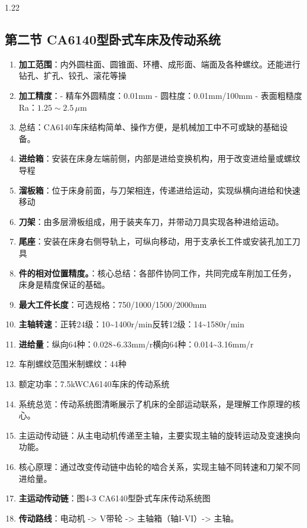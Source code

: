 \documentclass[12pt,a4paper]{article}
\begin{document}
\begin{spacing}{1.22}
\subsection{第二节 CA6140型卧式车床及传动系统}
\begin{tcolorbox}[colback=yellow!6,colframe=red!55!black,title=重点,left=1mm,right=1mm]
\begin{enumerate}[leftmargin=2.2em,label=\arabic*.]
  \item \textbf{加工范围}：内外圆柱面、圆锥面、环槽、成形面、端面及各种螺纹。还能进行钻孔、扩孔、铰孔、滚花等操
  \item \textbf{加工精度}：- 精车外圆精度：0.01mm - 圆柱度：0.01mm/100mm - 表面粗糙度 Ra：$1.25\sim2.5\,\mu\text{m}$
  \item 总结：CA6140车床结构简单、操作方便，是机械加工中不可或缺的基础设备。
  \item \textbf{进给箱}：安装在床身左端前侧，内部是进给变换机构，用于改变进给量或螺纹导程
  \item \textbf{溜板箱}：位于床身前面，与刀架相连，传递进给运动，实现纵横向进给和快速移动
  \item \textbf{刀架}：由多层滑板组成，用于装夹车刀，并带动刀具实现各种进给运动。
  \item \textbf{尾座}：安装在床身右侧导轨上，可纵向移动，用于支承长工件或安装孔加工刀具
  \item \textbf{件的相对位置精度。}：核心总结：各部件协同工作，共同完成车削加工任务，床身是精度保证的基础。
  \item \textbf{最大工件长度}：可选规格：750/1000/1500/2000mm
  \item \textbf{主轴转速}：正转24级：10\textasciitilde{}1400r/min反转12级：14\textasciitilde{}1580r/min
  \item \textbf{进给量}：纵向64种：0.028\textasciitilde{}6.33mm/r横向64种：0.014\textasciitilde{}3.16mm/r
  \item 车削螺纹范围米制螺纹：44种
  \item 额定功率：7.5kWCA6140车床的传动系统
  \item 系统总览：传动系统图清晰展示了机床的全部运动联系，是理解工作原理的核心。
  \item 主运动传动链：从主电动机传递至主轴，主要实现主轴的旋转运动及变速换向功能。
  \item 核心原理：通过改变传动链中齿轮的啮合关系，实现主轴不同转速和刀架不同进给量。
  \item \textbf{主运动传动链}：图4-3 CA6140型卧式车床传动系统图
  \item \textbf{传动路线}：电动机 -> V带轮 -> 主轴箱（轴I-VI）-> 主轴。

\end{enumerate}
\end{tcolorbox}
\end{spacing}
\end{document}

